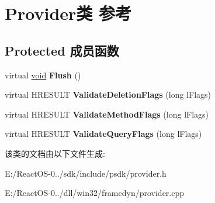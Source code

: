 \hypertarget{class_provider}{}\section{Provider类 参考}
\label{class_provider}
\subsection*{Protected 成员函数}
\begin{DoxyCompactItemize}
\item 
\mbox{\label{class_provider_ac84b16abace7e9dab414b5eac5dc7dfd}} 
virtual \hyperlink{interfacevoid}{void} {\bfseries Flush} ()
\item 
\mbox{\label{class_provider_adc5897770480e2337f18fd36a5565010}} 
virtual H\+R\+E\+S\+U\+LT {\bfseries Validate\+Deletion\+Flags} (long l\+Flags)
\item 
\mbox{\label{class_provider_a97ff27e34c41cd848c2fa6817ae4b4aa}} 
virtual H\+R\+E\+S\+U\+LT {\bfseries Validate\+Method\+Flags} (long l\+Flags)
\item 
\mbox{\label{class_provider_aea278742592cb91873a36ef35a86e75e}} 
virtual H\+R\+E\+S\+U\+LT {\bfseries Validate\+Query\+Flags} (long l\+Flags)
\end{DoxyCompactItemize}


该类的文档由以下文件生成\+:\begin{DoxyCompactItemize}
\item 
E\+:/\+React\+O\+S-\/0../sdk/include/psdk/provider.\+h\item 
E\+:/\+React\+O\+S-\/0../dll/win32/framedyn/provider.\+cpp\end{DoxyCompactItemize}
